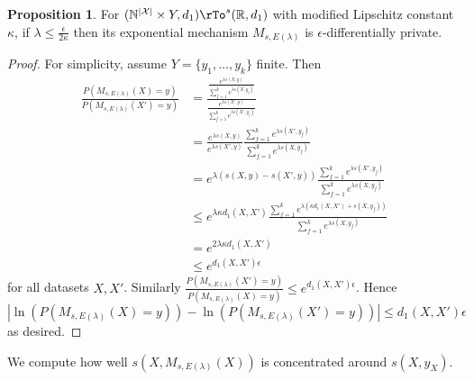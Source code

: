 \documentclass[12pt]{amsart}
\theoremstyle{definition}
\newtheorem{proposition}[theorem]{Proposition}
\begin{document}
\begin{proposition} \label{exponential_mechanism_privacy} For $(\mathbb{N}^{|\mathcal{X}|} \times Y, d_1) \rTo^s (\mathbb{R}, d_1)$ with modified Lipschitz constant $\kappa$, if $\lambda \leq \frac{\epsilon}{2 \kappa}$ then its exponential mechanism $M_{s, E(\lambda)}$ is $\epsilon$-differentially private.
\end{proposition}
\begin{proof} For simplicity, assume $Y = \{y_1, \dots , y_k\}$ finite. Then
\begin{align*}
\frac{P(M_{s, E(\lambda)}(X) = y)}{P(M_{s, E(\lambda)}(X') = y)} & = \frac{ \frac{e^{\lambda s(X, y)}}{\sum\limits_{f = 1}^k e^{\lambda s(X, y_f)}} }{ \frac{e^{\lambda s(X', y)}}{\sum\limits_{f = 1}^k e^{\lambda s(X', y_f)}} } \\
 & = \frac{e^{\lambda s(X, y)}}{e^{\lambda s(X', y)}} \frac{\sum\limits_{f = 1}^k e^{\lambda s(X', y_f)}}{\sum\limits_{f = 1}^k e^{\lambda s(X, y_f)}} \\
 & = e^{\lambda (s(X, y) - s(X', y))} \frac{\sum\limits_{f = 1}^k e^{\lambda s(X', y_f)}}{\sum\limits_{f = 1}^k e^{\lambda s(X, y_f)}} \\
 & \leq e^{\lambda \kappa d_1(X, X')} \frac{\sum\limits_{f = 1}^k e^{\lambda (\kappa d_1(X, X') + s(X, y_f))}}{\sum\limits_{f = 1}^k e^{\lambda s(X, y_f)}} \\
 & = e^{2 \lambda \kappa d_1(X, X')} \\
 & \leq e^{d_1(X, X') \epsilon}
\end{align*}
for all datasets $X, X'$. Similarly $\frac{P(M_{s, E(\lambda)}(X') = y)}{P(M_{s, E(\lambda)}(X) = y)} \leq e^{d_1(X, X') \epsilon}$. Hence $|\ln(P(M_{s, E(\lambda)}(X) = y)) - \ln(P(M_{s, E(\lambda)}(X') = y))| \leq d_1(X, X') \epsilon$ as desired.
\end{proof}

We compute how well $s(X, M_{s, E(\lambda)}(X))$ is concentrated around $s(X, y_X)$.
\end{document}
